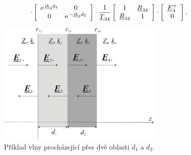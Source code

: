\begin{equation}
\cdot
\left[ \begin{array}{cc}
\mathrm{e\,}^{\mathrm{j}{\underline{k}}_{3} d_{2}} & 0 \\
0 & \mathrm{e\,}^{-\mathrm{j}{\underline{k}}_{3} d_{2}} \\
\end{array} \right]
\cdot
\frac{1}{{\underline{T}}_ {34}}
\left[ \begin{array}{cc}
1 & {\underline{R}}_{34} \\
{\underline{R}}_{34} & 1 \\
\end{array} \right]
\cdot
\left[ \begin{array}{c}
{\underline{E}}_{4}^{+} \\
0 \\
\end{array} \right].
\end{equation} 
\begin{figure}[!h]
	\centering
	\includegraphics[width=8cm]{evlny_maticova_metoda3.png}
	\caption{Příklad vlny procházející přes dvě oblasti $d_{1}$ a $d_{2}$.}
	\label{obr:evlny_maticova_metoda3}
\end{figure}

